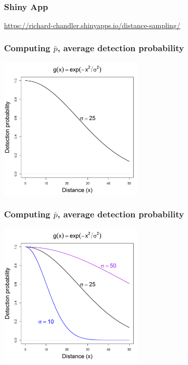 \documentclass[color=usenames,dvipsnames]{beamer}\usepackage[]{graphicx}\usepackage[]{color}
\begin{document}
\begin{frame}
  \frametitle{Shiny App}
  \color{blue}
  \centering
  \url{
    https://richard-chandler.shinyapps.io/distance-sampling/
  } \\
\end{frame}








\begin{frame}
  \frametitle{Computing $\bar{p}$, average detection probability}
\begin{center}
  \includegraphics[width=7cm]{figs/detfun1}
\end{center}
\end{frame}




\begin{frame}
  \frametitle{Computing $\bar{p}$, average detection probability}
\begin{center}
  \includegraphics[width=7cm]{figs/detfun2}
\end{center}
\end{frame}
\end{document}
